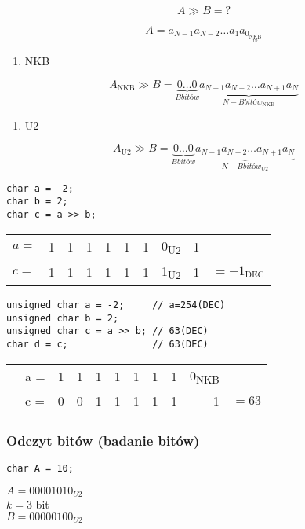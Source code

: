 \documentclass[11pt]{article}
\begin{document}
$$A \gg B = ?$$

$$A= a_{N-1} a_{N-2} \dots a_1 a_0 _{\underset{\text{U2}}{\text{NKB}}} $$
\begin{enumerate}
\item NKB
\end{enumerate}
$$A_{\text{NKB}} \gg B = \underbrace{0 \dots 0}_{B \textit{bitów}} \underbrace{a_{N-1} a_{N-2} \dots a_{N+1} a_{N}}_{ {N-B} \textit{bitów}} _\text{NKB} $$

\begin{enumerate}
\item U2
\end{enumerate}
$$A_{\text{U2}} \gg B = \underbrace{0 \dots 0}_{B \textit{bitów}} \underbrace{a_{N-1} a_{N-2} \dots a_{N+1} a_{N}}_{ {N-B} \textit{bitów}} _\text{U2} $$

\hline

\begin{verbatim}
char a = -2;
char b = 2;
char c = a >> b;
\end{verbatim}
\begin{center}
\begin{tabular}{lrrrrrrlrl}
\(a =\) & 1 & 1 & 1 & 1 & 1 & 1 & 0\textsubscript{U2} & 1 & \\
\(c =\) & 1 & 1 & 1 & 1 & 1 & 1 & 1\textsubscript{U2} & 1 & \(= -1_{\text{DEC}}\)\\
\end{tabular}
\end{center}

\hline
\begin{verbatim}
unsigned char a = -2;     // a=254(DEC)
unsigned char b = 2;
unsigned char c = a >> b; // 63(DEC)
char d = c;               // 63(DEC)
\end{verbatim}

\begin{center}
\begin{tabular}{llrrrrrrrrl}
 & a = & 1 & 1 & 1 & 1 & 1 & 1 & 1 & 0\textsubscript{NKB} & \\
 & c = & 0 & 0 & 1 & 1 & 1 & 1 & 1 & 1 & \(= 63\)\\
\end{tabular}
\end{center}

\subsubsection{Odczyt bitów (badanie bitów)}
\label{sec:org71109b2}
\begin{verbatim}
char A = 10;
\end{verbatim}
\(A=00001010_{U2}\) \\
\(k=3\) bit \\
\(B=00000100_{U2}\)
\end{document}
